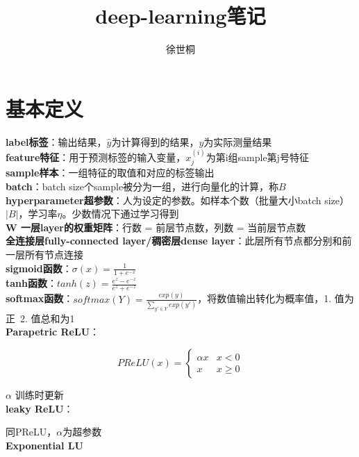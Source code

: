 \documentclass[UTF8]{ctexart}
\title{deep-learning笔记}
\author{徐世桐}
\date{}
\begin{document}
\maketitle

\section{基本定义}

\noindent \textbf{label标签}：输出结果，$\hat{y} $为计算得到的结果，$y$为实际测量结果\\
\textbf{feature特征}：用于预测标签的输入变量，$x^{(i)}_j$为第i组sample第j号特征\\
\textbf{sample样本}：一组特征的取值和对应的标签输出\\
\textbf{batch}：batch size个sample被分为一组，进行向量化的计算，称$B$\\
\textbf{hyperparameter超参数}：人为设定的参数。如样本个数（批量大小batch size）$|B|$，学习率$\eta $。少数情况下通过学习得到\\
\textbf{W 一层layer的权重矩阵}：行数 = 前层节点数，列数 = 当前层节点数\\
\textbf{全连接层fully-connected layer/稠密层dense layer}：此层所有节点都分别和前一层所有节点连接\\
\textbf{sigmoid函数}：$\sigma(x) = \frac{1}{1+e^{-x}}$\\
\textbf{tanh函数}：$tanh(z) = \frac{e^z - e^{-z}}{e^z + e^{-z}}$\\
\textbf{softmax函数}：$softmax(Y) = \frac{exp(y)}{\sum_{y' \in Y} exp(y') } $，将数值输出转化为概率值，1. 值为正\ 2. 值总和为1\\
\textbf{Parapetric ReLU}：

  \begin{equation*}
    PReLU(x) = \begin{cases}
      \alpha x & x < 0\\
      x & x \geq 0
    \end{cases}
  \end{equation*}
  
  $\alpha$ 训练时更新\\
\textbf{leaky ReLU}：

  同PReLU，$\alpha$为超参数\\
\textbf{Exponential LU}
\end{document}
